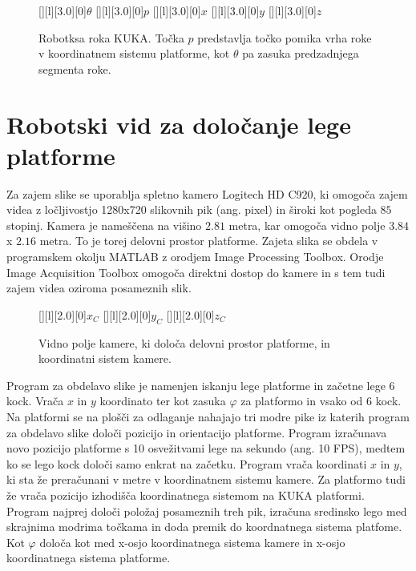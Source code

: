 \begin{figure}[h]
[][l][3.0][0]{$\theta$}
[][l][3.0][0]{$p$}
[][l][3.0][0]{$x$}
[][l][3.0][0]{$y$}
[][l][3.0][0]{$z$}
\centering {}
\caption{Robotksa roka KUKA. Točka $p$ predstavlja točko pomika vrha roke v koordinatnem sistemu platforme, kot $\theta$ pa zasuka predzadnjega segmenta roke.}
\label{fig:RokaKoor}
\end{figure}


\section{Robotski vid za določanje lege platforme}\label{pog:RobVid}

Za zajem slike se uporablja spletno kamero Logitech HD C920, ki omogoča zajem videa z ločljivostjo 1280x720 slikovnih pik (ang. pixel) in široki kot pogleda $85$ stopinj. Kamera je nameščena na višino $2.81$ metra, kar omogoča vidno polje $3.84$ x $2.16$ metra. To je torej delovni prostor platforme.
Zajeta slika se obdela v programskem okolju MATLAB z orodjem Image Processing Toolbox. Orodje Image Acquisition Toolbox omogoča direktni dostop do kamere in s tem tudi zajem videa oziroma posameznih slik.


\begin{figure}[h]
[][l][2.0][0]{$x_C$}
[][l][2.0][0]{$y_C$}
[][l][2.0][0]{$z_C$}
\centering {}
\caption{Vidno polje kamere, ki določa delovni prostor platforme, in koordinatni sistem kamere.}
\end{figure}

Program za obdelavo slike je namenjen iskanju lege platforme in začetne lege 6 kock. Vrača $x$ in $y$ koordinato ter kot zasuka $\varphi$ za platformo in vsako od 6 kock. Na platformi se na plošči za odlaganje nahajajo tri modre pike iz katerih program za obdelavo slike določi pozicijo in orientacijo platforme. Program izračunava novo pozicijo platforme s 10 osvežitvami lege na sekundo (ang. 10 FPS), medtem ko se lego kock določi samo enkrat na začetku. Program vrača koordinati $x$ in $y$, ki sta že preračunani v metre v koordinatnem sistemu kamere. Za platformo tudi že vrača pozicijo izhodišča koordinatnega sistemom na KUKA platformi. Program najprej določi položaj posameznih treh pik, izračuna sredinsko lego med skrajnima modrima točkama in doda premik do koordnatnega sistema platfome. Kot $\varphi$ določa kot med x-osjo koordinatnega sistema kamere in x-osjo koordinatnega sistema platforme.

